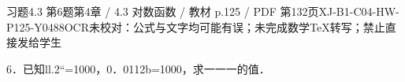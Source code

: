 \begin{bankitem}{习题4.3 第6题}{第4章 / 4.3 对数函数 / 教材 p.125 / PDF 第132页}{XJ-B1-C04-HW-P125-Y0488}{OCR未校对：公式与文字均可能有误；未完成数学TeX转写；禁止直接发给学生}
\begin{ocrdraft}
\par
6．已知ll.2“=1000，0．0112b=1000，求一一一的值．
\end{ocrdraft}
\end{bankitem}
